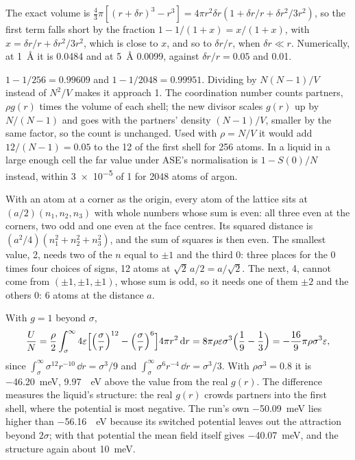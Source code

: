 \label{sec:ob-solutions}

The exact volume is $\frac43\pi[(r + \delta r)^3 -
r^3] = 4\pi r^2\delta r(1 + \delta r/r + \delta r^2/3r^2)$, so the first
term falls short by the fraction $1 - 1/(1 + x) = x/(1 + x)$, with $x =
\delta r/r + \delta r^2/3r^2$, which is close to $x$, and so to $\delta
r/r$, when $\delta r \ll r$. Numerically, at
\SI{1}{\angstrom} it is 0.0484 and at \SI{5}{\angstrom} 0.0099, against
$\delta r/r = 0.05$ and 0.01.

$1 - 1/256 = 0.99609$ and $1 - 1/2048 = 0.99951$.
Dividing by $N(N - 1)/V$ instead of $N^2/V$ makes it approach 1. The
coordination number counts partners, $\rho g(r)$ times the volume of each
shell; the new divisor scales $g(r)$ up by $N/(N - 1)$ and goes with the
partners' density $(N - 1)/V$, smaller by the same factor, so the count
is unchanged. Used with $\rho = N/V$ it would add $12/(N - 1) = 0.05$ to
the 12 of the first shell for 256 atoms. In a liquid in a large enough
cell the far value under ASE's normalisation is $1 - S(0)/N$ instead,
within \num{3e-5} of 1 for 2048 atoms of argon.

With an atom at a corner as the origin, every atom
of the lattice sits at $(a/2)(n_1, n_2, n_3)$ with whole numbers whose sum
is even: all three even at the corners, two odd and one even at the face
centres. Its squared distance is $(a^2/4)(n_1^2 + n_2^2 + n_3^2)$, and the
sum of squares is then even. The smallest value, 2, needs two of the $n$
equal to $\pm1$ and the third 0: three places for the 0 times four
choices of signs, 12 atoms at $\sqrt2\,a/2 = a/\sqrt2$. The next, 4,
cannot come from $(\pm1, \pm1, \pm1)$, whose sum is odd, so it needs one
of them $\pm2$ and the others 0: 6 atoms at the distance $a$.

With $g = 1$ beyond $\sigma$,
\begin{equation*}
   \frac{U}{N} = \frac{\rho}{2}\int_\sigma^\infty4\varepsilon\Bigl[
   \Bigl(\frac\sigma r\Bigr)^{12} - \Bigl(\frac\sigma r\Bigr)^6\Bigr]
   4\pi r^2\,\mathrm{d} r
   = 8\pi\rho\varepsilon\sigma^3\Bigl(\frac19 - \frac13\Bigr)
   = -\frac{16}{9}\pi\rho\sigma^3\varepsilon ,
\end{equation*}
since $\int_\sigma^\infty\sigma^{12}r^{-10}\,\dd r = \sigma^3/9$ and
$\int_\sigma^\infty\sigma^6r^{-4}\,\dd r = \sigma^3/3$. With $\rho\sigma^3
= 0.8$ it is \SI{-46.20}{\milli\electronvolt}, \SI{9.97}{\milli
\electronvolt} above the value from the real $g(r)$. The difference
measures the liquid's structure: the real $g(r)$ crowds partners into the
first shell, where the potential is most negative. The run's own
\SI{-50.09}{\milli\electronvolt} lies higher than \SI{-56.16}{\milli
\electronvolt} because its switched potential leaves out the attraction
beyond $2\sigma$; with that potential the mean field itself gives
\SI{-40.07}{\milli\electronvolt}, and the structure again about
\SI{10}{\milli\electronvolt}.

